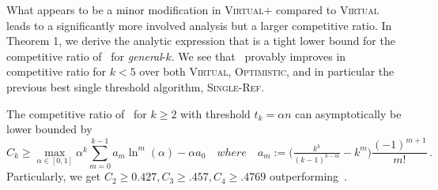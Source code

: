 What appears to be a minor modification in \textsc{Virtual+} compared to \textsc{Virtual} leads to a significantly more involved analysis but a larger competitive ratio. In Theorem 1, we derive the analytic expression that is a tight lower bound for the competitive ratio of \algoname\ for \emph{general}-$k$. We see that \algoname\ provably improves in competitive ratio for $k<5$ over both \textsc{Virtual}, \textsc{Optimistic}, and in particular the previous best single threshold algorithm, \textsc{Single-Ref}.

\begin{theorem}
The competitive ratio of \algoname\ for $k \geq 2$ with threshold $t_k = \alpha n$ can asymptotically be lower bounded by 
\begin{equation}
    C_k \geq  \max_{\alpha \in [0,1]}  {\alpha}^k \sum_{m = 0}^{k - 1} a_m \ln^m (\alpha)- \alpha a_0
    \quad where  \quad
    a_m := \big(\tfrac{k^k}{(k-1)^{k-m}} - k^m\big)\frac{(-1)^{m+1}}{m!}
    \, .
\end{equation}
Particularly, we get $C_2\geq0.427, C_3\geq .457, C_4\geq.4769$ outperforming~\citet{albers2020new}.
\label{thm:general_k_theorem1}
\end{theorem}

